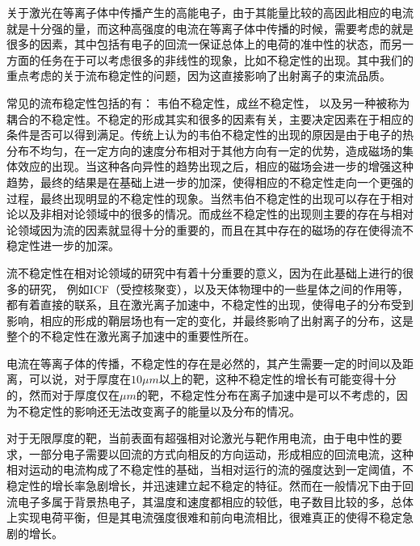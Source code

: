 

关于激光在等离子体中传播产生的高能电子，由于其能量比较的高因此相应的电流就是十分强的量，而这种高强度的电流在等离子体中传播的时候，需要考虑的就是很多的因素，其中包括有电子的回流一保证总体上的电荷的准中性的状态，而另一方面的任务在于可以考虑很多的非线性的现象，比如不稳定性的出现。其中我们的重点考虑的关于流布稳定性的问题，因为这直接影响了出射离子的束流品质。

常见的流布稳定性包括的有： 韦伯不稳定性，成丝不稳定性， 以及另一种被称为耦合的不稳定性。不稳定的形成其实和很多的因素有关，主要决定因素在于相应的条件是否可以得到满足。传统上认为的韦伯不稳定性的出现的原因是由于电子的热分布不均匀，在一定方向的速度分布相对于其他方向有一定的优势，造成磁场的集体效应的出现。当这种各向异性的趋势出现之后，相应的磁场会进一步的增强这种趋势，最终的结果是在基础上进一步的加深，使得相应的不稳定性走向一个更强的过程，最终出现明显的不稳定性的现象。当然韦伯不稳定性的出现可以存在于相对论以及非相对论领域中的很多的情况。而成丝不稳定性的出现则主要的存在与相对论领域因为流的因素就显得十分的重要的，而且在其中存在的磁场的存在使得流不稳定性进一步的加深。


流不稳定性在相对论领域的研究中有着十分重要的意义，因为在此基础上进行的很多的研究， 例如ICF（受控核聚变），以及天体物理中的一些星体之间的作用等，都有着直接的联系，且在激光离子加速中，不稳定性的出现，使得电子的分布受到影响，相应的形成的鞘层场也有一定的变化，并最终影响了出射离子的分布，这是整个的不稳定性在激光离子加速中的重要性所在。

电流在等离子体的传播，不稳定性的存在是必然的，其产生需要一定的时间以及距离，可以说，对于厚度在$10\mu m$以上的靶，这种不稳定性的增长有可能变得十分的，然而对于厚度仅在$\mu m$的靶，不稳定性分布在离子加速中是可以不考虑的，因为不稳定性的影响还无法改变离子的能量以及分布的情况。


对于无限厚度的靶，当前表面有超强相对论激光与靶作用电流，由于电中性的要求，一部分电子需要以回流的方式向相反的方向运动，形成相应的回流电流，这种相对运动的电流构成了不稳定性的基础，当相对运行的流的强度达到一定阈值，不稳定性的增长率急剧增长，并迅速建立起不稳定的特征。然而在一般情况下由于回流电子多属于背景热电子，其温度和速度都相应的较低，电子数目比较的多，总体上实现电荷平衡，但是其电流强度很难和前向电流相比，很难真正的使得不稳定急剧的增长。






